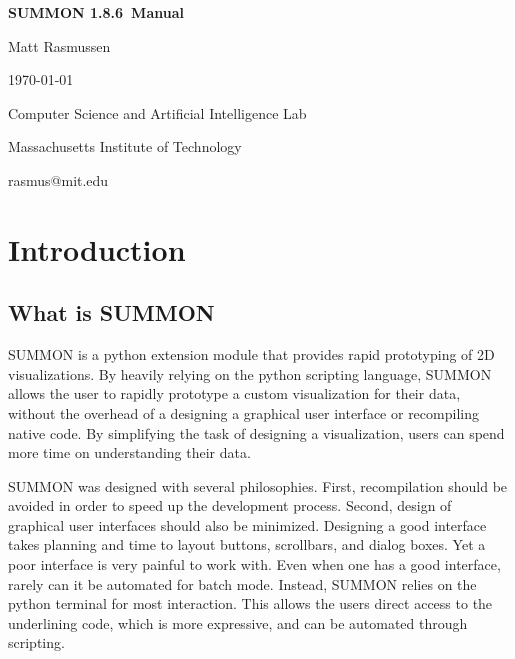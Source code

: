 \documentclass[12pt]{article}
\newcommand{\version}{1.8.6}
\begin{document}
\begin{titlepage}

\begin{center}

\vspace*{2.5in}

{\huge \bf {}\selectfont 
SUMMON \version\ Manual
}
\vspace*{.5in}

{\large
Matt Rasmussen

\today
}
\vspace*{.5in}

Computer Science and Artificial Intelligence Lab

Massachusetts Institute of Technology

\vspace*{.25in}

rasmus@mit.edu
\end{center}

\end{titlepage}


\tableofcontents

\clearpage

\section{Introduction}
\label{sec:intro}


\subsection{What is SUMMON}

SUMMON is a python extension module that provides rapid prototyping of 2D
visualizations.  By heavily relying on the python scripting language, SUMMON
allows the user to rapidly prototype a custom visualization for their data, 
without the overhead of a designing a graphical user interface or recompiling 
native code.  By simplifying the task of designing a visualization, users can 
spend more time on understanding their data. 

SUMMON was designed with several philosophies.  First, recompilation should
be avoided in order to speed up the development process.  Second, design of
graphical user interfaces should also be minimized.  Designing a good interface
takes planning and time to layout buttons, scrollbars, and dialog boxes.  Yet a 
poor interface is very painful to work with. Even when one has a good interface,
rarely can it be automated for batch mode.  Instead, SUMMON relies on the python
terminal for most interaction.  This allows the users direct access to  the
underlining code, which is more expressive, and can be automated through
scripting.  
\end{document}
